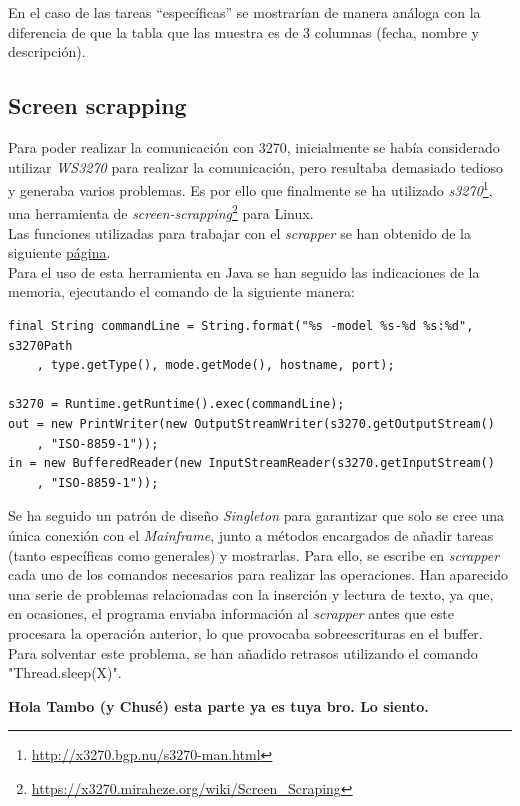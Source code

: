 \documentclass[10pt,a4paper]{article}
\begin{document}
En el caso de las tareas ``específicas'' se mostrarían de manera análoga con la diferencia de que la tabla que las muestra es de 3 columnas (fecha, nombre y descripción).


\subsection{Screen scrapping}

Para poder realizar la comunicación con 3270, inicialmente se había considerado utilizar \textit{WS3270} para realizar la comunicación, pero resultaba demasiado tedioso y generaba varios problemas. Es por ello que finalmente se ha utilizado \textit{s3270}\footnote{\url{http://x3270.bgp.nu/s3270-man.html}}, una herramienta de \textit{screen-scrapping}\footnote{\url{https://x3270.miraheze.org/wiki/Screen_Scraping}} para Linux. \\
Las funciones utilizadas para trabajar con el \textit{scrapper} se han obtenido de la siguiente \href{https://vebqa.github.io/f3270/release/doxygen/S3270_8java_source.html}{página}.\\
Para el uso de esta herramienta en Java se han seguido las indicaciones de la memoria, ejecutando el comando de la siguiente manera:
\begin{lstlisting}
final String commandLine = String.format("%s -model %s-%d %s:%d", s3270Path
	, type.getType(), mode.getMode(), hostname, port);

s3270 = Runtime.getRuntime().exec(commandLine);
out = new PrintWriter(new OutputStreamWriter(s3270.getOutputStream()
	, "ISO-8859-1"));
in = new BufferedReader(new InputStreamReader(s3270.getInputStream()
	, "ISO-8859-1"));
\end{lstlisting}
Se ha seguido un patrón de diseño \textit{Singleton} para garantizar que solo se cree una única conexión con el \textit{Mainframe}, junto a métodos encargados de añadir tareas (tanto específicas como generales) y mostrarlas. Para ello, se escribe en \textit{scrapper} cada uno de los comandos necesarios para realizar las operaciones. Han aparecido una serie de problemas relacionadas con la inserción y lectura de texto, ya que, en ocasiones, el programa enviaba información al \textit{scrapper} antes que este procesara la operación anterior, lo que provocaba sobreescrituras en el buffer. Para solventar este problema, se han añadido retrasos utilizando el comando "Thread.sleep(X)".

\textbf{{\Huge Hola Tambo (y Chusé) esta parte ya es tuya bro. Lo siento.}}
\end{document}
